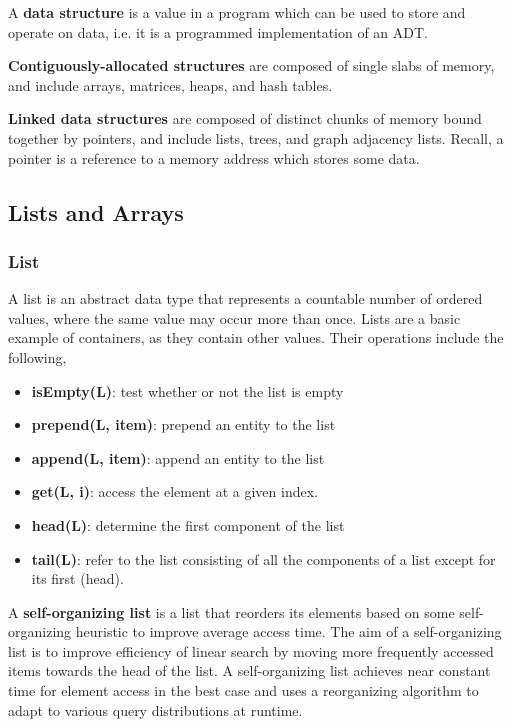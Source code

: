 \documentclass{article}
\begin{document}
    A \textbf{data structure} is a value in a program which can be used to store and operate on data, i.e. it is a programmed implementation of an ADT.
    
    \textbf{Contiguously-allocated structures} are composed of single slabs of memory, and include arrays, matrices, heaps, and hash tables.
     
    \textbf{Linked data structures} are composed of distinct chunks of memory bound together by pointers, and include lists, trees, and graph adjacency lists. Recall, a pointer is a reference to a memory address which stores some data.

    \subsection{Lists and Arrays}
    \subsubsection{List}
    A list is an abstract data type that represents a countable number of ordered values, where the same value may occur more than once. Lists are a basic example of containers, as they contain other values. Their operations include the following,
    \begin{itemize}
        \item \textbf{isEmpty(L)}: test whether or not the list is empty
        \item \textbf{prepend(L, item)}: prepend an entity to the list
        \item \textbf{append(L, item)}: append an entity to the list
        \item \textbf{get(L, i)}: access the element at a given index.
        \item \textbf{head(L)}: determine the first component of the list
        \item \textbf{tail(L)}: refer to the list consisting of all the components of a list except for its first (head).
    \end{itemize}
    
    A \textbf{self-organizing list} is a list that reorders its elements based on some self-organizing heuristic to improve average access time. The aim of a self-organizing list is to improve efficiency of linear search by moving more frequently accessed items towards the head of the list. A self-organizing list achieves near constant time for element access in the best case and uses a reorganizing algorithm to adapt to various query distributions at runtime.
    
\end{document}
